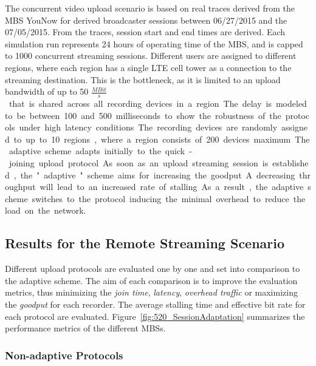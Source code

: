 The concurrent video upload scenario is based on real traces derived from the \ac{MBS} YouNow for derived broadcaster sessions between 06/27/2015 and the 07/05/2015.
From the traces, session start and end times are derived.
Each simulation run represents 24 hours of operating time of the \ac{MBS}, and is capped to 1000 concurrent streaming sessions.
Different users are assigned to different regions, where each region has a single \ac{LTE} cell tower as a connection to the streaming destination.
This is the bottleneck, as it is limited to an upload bandwidth of up to 50 \unit{$\frac{MBit}{s}$} that is shared across all 
recording devices in a region.
The delay is modeled to be between 100 and 500 milliseconds to show the robustness of the protocols under high latency conditions.
The recording devices are randomly assigned to up to 10 regions, where a region consists of 200 devices maximum.

The adaptive scheme adapts initially to the quick-joining upload protocol.
As soon as an upload streaming session is established, the "adaptive" scheme aims for increasing the goodput.
A decreasing throughput will lead to an increased rate of \ac{stalling}.
As a result, the adaptive scheme switches to the protocol inducing the minimal overhead to reduce the load on the network.
\subsection{Results for the Remote Streaming Scenario}
\label{sec:520_eval_concurrent}
Different upload protocols are evaluated one by one and set into comparison to the adaptive scheme.
The aim of each comparison is to improve the evaluation metrics, thus minimizing the \emph{join time}, \emph{latency}, \emph{overhead traffic} or maximizing the \emph{goodput} for each recorder.
The average \ac{stalling} time and effective bit rate for each protocol are evaluated.
Figure~\ref{fig:520_SessionAdaptation} summarizes the performance metrics of the different \ac{MBS}s.
\subsubsection{Non-adaptive Protocols}
